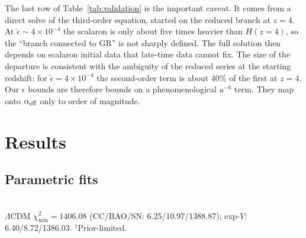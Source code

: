 \documentclass[11pt,a4paper]{article}
\newcommand{\aeff}{\alpha_{\rm eff}}
\newcommand{\et}{\tilde\epsilon}
\begin{document}
The last row of Table~\ref{tab:validation} is the important caveat. It comes from a direct solve of the third-order equation, started on the reduced branch at $z=4$. At $\et\sim4\times10^{-4}$ the scalaron is only about five times heavier than $H(z=4)$, so the ``branch connected to GR'' is not sharply defined. The full solution then depends on scalaron initial data that late-time data cannot fix. The size of the departure is consistent with the ambiguity of the reduced series at the starting redshift: for $\et=4\times10^{-4}$ the second-order term is about 40\% of the first at $z=4$. Our $\epsilon$ bounds are therefore bounds on a phenomenological $a^{-6}$ term. They map onto $\aeff$ only to order of magnitude.

\section{Results}\label{sec:results}
\subsection{Parametric fits}
\begin{table}[h]\centering\small
\caption{Planck $r_d$ prior. $k$ counts sampled parameters plus $M$. Uncertainties are 68\%; upper limits are 95\%.}\label{tab:fits}
\\[2pt]
{\footnotesize $\Lambda$CDM $\chi^2_{\min}=1406.08$ (CC/BAO/SN: 6.25/10.97/1388.87); exp-$V$: 6.40/8.72/1386.03. $^\dagger$Prior-limited.}
\end{table}
\end{document}

